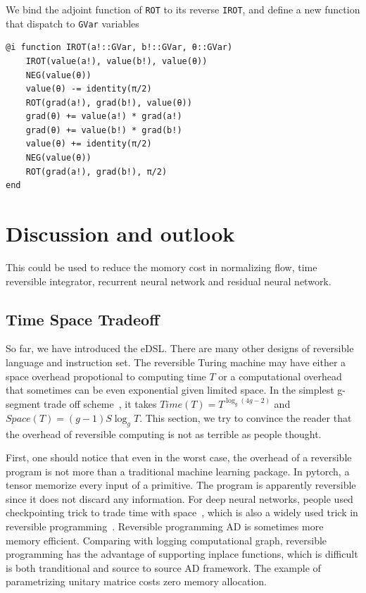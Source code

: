 \documentclass[aps,twocolumn,longbibliography,english,superscriptaddress,prr]{revtex4-1}
\newcommand{\<}{\langle}
\renewcommand{\>}{\rangle}
\theoremstyle{definition}\newtheorem{definition}{\textit{Definition}}
\begin{document}
We bind the adjoint function of \texttt{ROT} to its reverse \texttt{IROT},
and define a new function that dispatch to \texttt{GVar} variables

\begin{minipage}{.44\textwidth}
\begin{lstlisting}
@i function IROT(a!::GVar, b!::GVar, θ::GVar)
    IROT(value(a!), value(b!), value(θ))
    NEG(value(θ))
    value(θ) -= identity(π/2)
    ROT(grad(a!), grad(b!), value(θ))
    grad(θ) += value(a!) * grad(a!)
    grad(θ) += value(b!) * grad(b!)
    value(θ) += identity(π/2)
    NEG(value(θ))
    ROT(grad(a!), grad(b!), π/2)
end
\end{lstlisting}
\end{minipage}

\section{Discussion and outlook}\label{sec:discussion}

This could be used to reduce the momory cost in normalizing flow, time reversible integrator, recurrent neural network and residual neural network.
\subsection{Time Space Tradeoff}\label{sec:timespace}
So far, we have introduced the eDSL. There are many other designs of reversible language and instruction set.
The reversible Turing machine may have either a space overhead propotional to computing time $T$ or a computational overhead that sometimes can be even exponential given limited space.
In the simplest g-segment trade off scheme~\cite{Bennett1989,Levine1990}, it takes $Time(T) = T^{\log _g(4g-2)}$ and $Space(T) = (g-1)S\log_g T$.
This section, we try to convince the reader that the overhead of reversible computing is not as terrible as people thought.

First, one should notice that even in the worst case, the overhead of a reversible program is not more than a traditional machine learning package. In pytorch, a tensor memorize every input of a primitive. The program is apparently reversible since it does not discard any information.
For deep neural networks, people used checkpointing trick to trade time with space~\cite{Chen2016}, which is also a widely used trick in reversible programming~\cite{Perumalla2013}. Reversible programming AD is sometimes more memory efficient. Comparing with logging computational graph, reversible programming has the advantage of supporting inplace functions, which is difficult is both tranditional and source to source AD framework. The example of parametrizing unitary matrice costs zero memory allocation.
\end{document}
